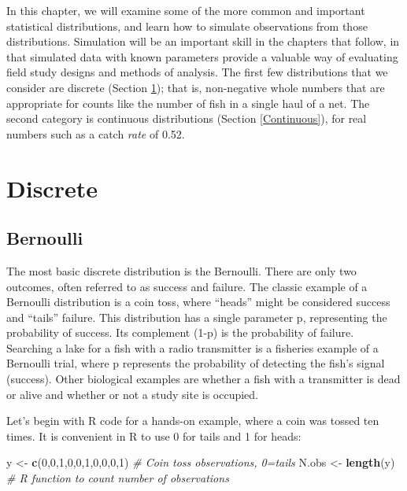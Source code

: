 \documentclass[
]{krantz}
\makeatletter
\newenvironment{Shaded}{\begin{snugshade}}{\end{snugshade}}
\newcommand{\CommentTok}[1]{\textcolor[rgb]{0.37,0.37,0.37}{\textit{#1}}}
\newcommand{\DecValTok}[1]{\textcolor[rgb]{0.06,0.06,0.06}{#1}}
\newcommand{\FunctionTok}[1]{\textcolor[rgb]{0.27,0.27,0.27}{\textbf{#1}}}
\newcommand{\NormalTok}[1]{#1}
\newcommand{\OtherTok}[1]{\textcolor[rgb]{0.37,0.37,0.37}{#1}}
\newenvironment{kframe}{%
\medskip{}
\setlength{\fboxsep}{.8em}
 \def\at@end@of@kframe{}%
 \ifinner\ifhmode%
  \def\at@end@of@kframe{\end{minipage}}%
  \begin{minipage}{\columnwidth}%
 \fi\fi%
 \def\FrameCommand##1{\hskip\@totalleftmargin \hskip-\fboxsep
 \colorbox{shadecolor}{##1}\hskip-\fboxsep
     \hskip-\linewidth \hskip-\@totalleftmargin \hskip\columnwidth}%
 \MakeFramed {\advance\hsize-\width
   \@totalleftmargin\z@ \linewidth\hsize
   \@setminipage}}%
 {\par\unskip\endMakeFramed%
 \at@end@of@kframe}
\renewenvironment{Shaded}{\begin{kframe}}{\end{kframe}}
\makeatother
\begin{document}
In this chapter, we will examine some of the more common and important statistical distributions, and learn how to simulate observations from those distributions. Simulation will be an important skill in the chapters that follow, in that simulated data with known parameters provide a valuable way of evaluating field study designs and methods of analysis. The first few distributions that we consider are discrete (Section \ref{Discrete}); that is, non-negative whole numbers that are appropriate for counts like the number of fish in a single haul of a net. The second category is continuous distributions (Section \ref{Continuous}), for real numbers such as a catch \emph{rate} of 0.52.

\hypertarget{Discrete}{%
\section{Discrete}\label{Discrete}}

\hypertarget{Bernoulli}{%
\subsection{Bernoulli}\label{Bernoulli}}

The most basic discrete distribution is the Bernoulli. There are only two outcomes, often referred to as success and failure. The classic example of a Bernoulli distribution is a coin toss, where ``heads'' might be considered success and ``tails'' failure. This distribution has a single parameter p, representing the probability of success. Its complement (1-p) is the probability of failure. Searching a lake for a fish with a radio transmitter is a fisheries example of a Bernoulli trial, where p represents the probability of detecting the fish's signal (success). Other biological examples are whether a fish with a transmitter is dead or alive and whether or not a study site is occupied.

Let's begin with R code for a hands-on example, where a coin was tossed ten times. It is convenient in R to use 0 for tails and 1 for heads:

\begin{Shaded}
\begin{Highlighting}[]
\NormalTok{y }\OtherTok{\textless{}{-}} \FunctionTok{c}\NormalTok{(}\DecValTok{0}\NormalTok{,}\DecValTok{0}\NormalTok{,}\DecValTok{1}\NormalTok{,}\DecValTok{0}\NormalTok{,}\DecValTok{0}\NormalTok{,}\DecValTok{1}\NormalTok{,}\DecValTok{0}\NormalTok{,}\DecValTok{0}\NormalTok{,}\DecValTok{0}\NormalTok{,}\DecValTok{1}\NormalTok{)  }\CommentTok{\# Coin toss observations, 0=tails}
\NormalTok{N.obs }\OtherTok{\textless{}{-}} \FunctionTok{length}\NormalTok{(y) }\CommentTok{\# R function to count number of observations}
\end{Highlighting}
\end{Shaded}
\end{document}
